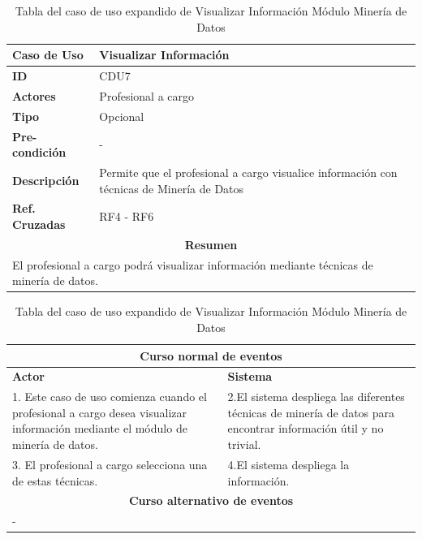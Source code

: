 \newpage
\clearpage

\begin{table}
	\centering
	\begin{tabular}{|p{6cm} |p{6cm}|}
		\hline \textbf{Caso de Uso} & Visualizar Información \\ 
		\hline \textbf{ID} & CDU7 \\ 
		\hline \textbf{Actores} & Profesional a cargo \\ 
		\hline \textbf{Tipo} & Opcional \\ 
		\hline \textbf{Pre-condición} & - \\ 
		\hline \textbf{Descripción} & Permite que el profesional a cargo visualice información con técnicas de Minería de Datos \\
		\hline \textbf{Ref. Cruzadas} & RF4 - RF6 \\ 
		\hline
		\multicolumn{2}{|c|}{\textbf{Resumen}} \\
		\hline
		\multicolumn{2}{|p{12cm}|}{El profesional a cargo podrá visualizar información mediante técnicas de minería de datos.} \\
		\hline 
	\end{tabular}  
	\begin{tabular}{|p{6cm}|p{6cm}|}
		\multicolumn{2}{|c|}{\textbf{Curso normal de eventos}} \\
		\hline \textbf{Actor} & \textbf{Sistema} \\ 
			\hline 1. Este caso de uso comienza cuando el profesional a cargo desea visualizar información mediante el módulo de minería de datos. & 2.El sistema despliega las diferentes técnicas de minería de datos para encontrar información útil y no trivial.  \\ 
			3. El profesional a cargo selecciona una de estas técnicas. & 4.El sistema despliega la información.  \\ 
			\hline
			\multicolumn{2}{|c|}{\textbf{Curso alternativo de eventos}} \\
			\hline
			\multicolumn{2}{|p{12cm}|}{ - } \\
			\hline
		\end{tabular}
		\caption{Tabla del caso de uso expandido de Visualizar Información Módulo Minería de Datos}
	\label{tabcdu7}
\end{table}

\newpage
\clearpage

